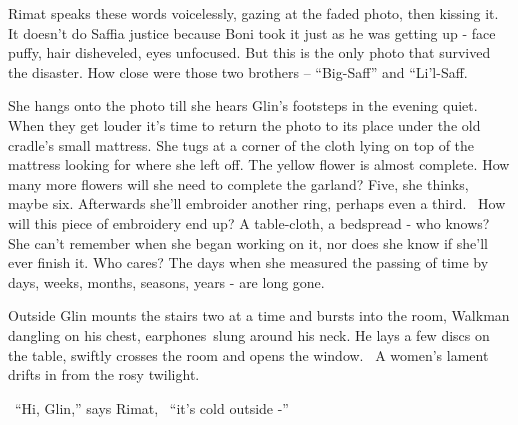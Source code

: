 \documentclass[letterpaper]{article}
\begin{document}
Rimat speaks these words voicelessly, gazing at the faded photo, then kissing it.
It\textcolor[rgb]{0.13333334,0.13333334,0.13333334}{ doesn't do Saffia}\textcolor{red}{
}\textcolor[rgb]{0.13333334,0.13333334,0.13333334}{justice because Boni took it }just as he was getting up - face
puffy, hair disheveled,\textcolor[rgb]{0.0,0.4392157,0.7529412}{
}\textcolor[rgb]{0.13333334,0.13333334,0.13333334}{eyes unfocused. But this is the only photo that survived }the
disaster\textcolor[rgb]{0.13333334,0.13333334,0.13333334}{. How close were those two brothers -- }{}``Big-Saff'' and
``Li'l-Saff{\textquotedbl}. 

S\textcolor[rgb]{0.13333334,0.13333334,0.13333334}{he hangs onto the photo till she hears Glin's footsteps in the
evening quiet. When }they get louder \textcolor[rgb]{0.13333334,0.13333334,0.13333334}{it's time to return the photo to
its place under the old cradle's }small\textcolor[rgb]{0.13333334,0.13333334,0.13333334}{ mattress. She tugs at a
corner of the}\textcolor[rgb]{0.0,0.4392157,0.7529412}{ }cloth lying on top of the
mattress\textcolor[rgb]{0.13333334,0.13333334,0.13333334}{ looking for where she left off. The yellow flower is almost
complete. How many more flowers will she need} \textcolor[rgb]{0.13333334,0.13333334,0.13333334}{to complete the
garland? Five, she }thinks\textcolor[rgb]{0.13333334,0.13333334,0.13333334}{, maybe six. Afterwards she'll embroider
another }ring, p\textcolor[rgb]{0.13333334,0.13333334,0.13333334}{erhaps even a third.~
}How\textcolor[rgb]{0.13333334,0.13333334,0.13333334}{ will this piece of embroidery end
}up?\textcolor[rgb]{0.13333334,0.13333334,0.13333334}{ }A\textcolor[rgb]{0.13333334,0.13333334,0.13333334}{
table-cloth,} a \textcolor[rgb]{0.13333334,0.13333334,0.13333334}{bedspread - who knows? She can't remember when she
began working on }it, nor does she know if she'll \textcolor[rgb]{0.13333334,0.13333334,0.13333334}{ever finish it. Who
cares? }The days when she measured the passing of time by days, weeks, months, seasons, years - are long gone. 

\textcolor[rgb]{0.13333334,0.13333334,0.13333334}{Outside Glin }mounts the stairs
\textcolor[rgb]{0.13333334,0.13333334,0.13333334}{two at a time and bursts into the room, Walkman dangling on his
chest, earphones~}slung\textcolor[rgb]{0.13333334,0.13333334,0.13333334}{ around his neck. He lays a few discs on the
table, swiftly crosses the room and opens the window.~ A women's lament drifts in from the rosy twilight.}

\textcolor[rgb]{0.13333334,0.13333334,0.13333334}{\ {}``}Hi,\textcolor[rgb]{0.13333334,0.13333334,0.13333334}{ Glin,''
says Rimat, \ {}``it's cold outside -''}
\end{document}
